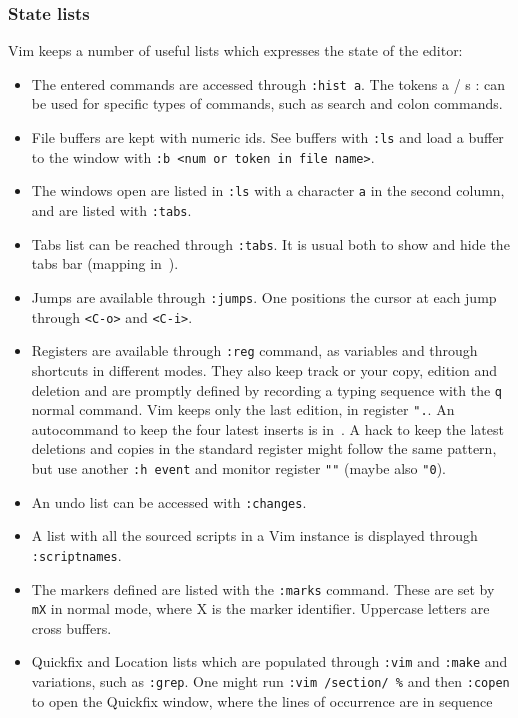 \documentclass{article}
\newcommand{\ttt}[1] {
	\texttt{<#1>}}
\newcommand{\tttt}[1]{\texttt{#1}}
\begin{document}
\subsubsection{State lists}\label{state}
Vim keeps a number of useful lists which expresses the state of the editor:
\begin{itemize}
	\item The entered commands are accessed through \tttt{:hist a}. 
    The tokens a / s : can be used for specific types of commands, such
		as search and colon commands.
	\item File buffers are kept with numeric ids. See buffers with \tttt{:ls} and load a buffer to the window with \tttt{:b <num or token in file name>}.
  \item The windows open are listed in \tttt{:ls} with a character \tttt{a} in the second column, and are listed with \tttt{:tabs}.
	\item Tabs list can be reached through \tttt{:tabs}.
		It is usual both to show and hide the tabs bar (mapping in~\cite{vimrc}).
	\item Jumps are available through \tttt{:jumps}.
		One positions the cursor at each jump through \ttt{C-o} and \ttt{C-i}.
  \item Registers are available through \tttt{:reg} command, as variables and through shortcuts in different modes.
    They also keep track or your copy, edition and deletion and are promptly defined
    by recording a typing sequence with the \tttt{q} normal command.
    Vim keeps only the last edition, in register \tttt{".}.
    An autocommand to keep the four latest inserts is in~\cite{vimrc}.
    A hack to keep the latest deletions and copies in the standard register
    might follow the same pattern, but use another \tttt{:h event} and
    monitor register \tttt{""} (maybe also \tttt{"0}).
	\item An undo list can be accessed with \tttt{:changes}.
	\item A list with all the sourced scripts in a Vim instance is displayed through \tttt{:scriptnames}.
	\item The markers defined are listed with the \tttt{:marks} command.
		These are set by \tttt{mX} in normal mode, where X is the marker identifier.
		Uppercase letters are cross buffers.
	\item Quickfix and Location lists which are populated through \tttt{:vim} and \tttt{:make}
		and variations, such as \tttt{:grep}.
		One might run \tttt{:vim /section/ \%} and then \tttt{:copen}
		to open the Quickfix window, where the lines of occurrence are in sequence

\end{itemize}
\end{document}
